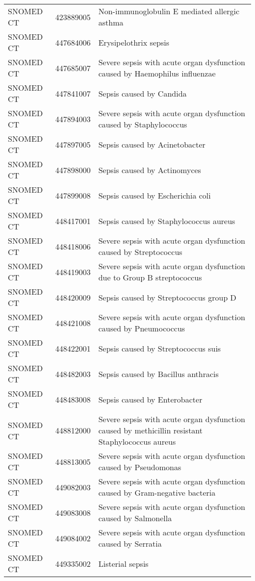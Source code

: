 \begin{longtable}{p{}p{}p{}}
  SNOMED CT & 423889005 & Non-immunoglobulin E mediated allergic asthma \\ 
  SNOMED CT & 447684006 & Erysipelothrix sepsis \\ 
  SNOMED CT & 447685007 & Severe sepsis with acute organ dysfunction caused by Haemophilus influenzae \\ 
  SNOMED CT & 447841007 & Sepsis caused by Candida \\ 
  SNOMED CT & 447894003 & Severe sepsis with acute organ dysfunction caused by Staphylococcus \\ 
  SNOMED CT & 447897005 & Sepsis caused by Acinetobacter \\ 
  SNOMED CT & 447898000 & Sepsis caused by Actinomyces \\ 
  SNOMED CT & 447899008 & Sepsis caused by Escherichia coli \\ 
  SNOMED CT & 448417001 & Sepsis caused by Staphylococcus aureus \\ 
  SNOMED CT & 448418006 & Severe sepsis with acute organ dysfunction caused by Streptococcus \\ 
  SNOMED CT & 448419003 & Severe sepsis with acute organ dysfunction due to Group B streptococcus \\ 
  SNOMED CT & 448420009 & Sepsis caused by Streptococcus group D \\ 
  SNOMED CT & 448421008 & Severe sepsis with acute organ dysfunction caused by Pneumococcus \\ 
  SNOMED CT & 448422001 & Sepsis caused by Streptococcus suis \\ 
  SNOMED CT & 448482003 & Sepsis caused by Bacillus anthracis \\ 
  SNOMED CT & 448483008 & Sepsis caused by Enterobacter \\ 
  SNOMED CT & 448812000 & Severe sepsis with acute organ dysfunction caused by methicillin resistant Staphylococcus aureus \\ 
  SNOMED CT & 448813005 & Severe sepsis with acute organ dysfunction caused by Pseudomonas \\ 
  SNOMED CT & 449082003 & Severe sepsis with acute organ dysfunction caused by Gram-negative bacteria \\ 
  SNOMED CT & 449083008 & Severe sepsis with acute organ dysfunction caused by Salmonella \\ 
  SNOMED CT & 449084002 & Severe sepsis with acute organ dysfunction caused by Serratia \\ 
  SNOMED CT & 449335002 & Listerial sepsis \\ 

\end{longtable}
